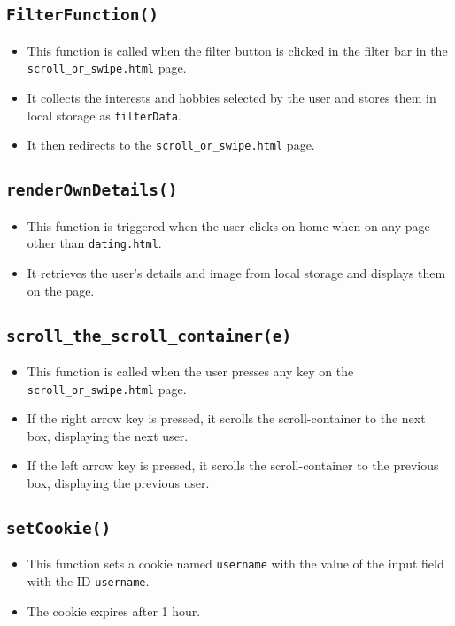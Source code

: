 \documentclass[12pt,a4paper]{article}
\begin{document}
\subsection{\texttt{FilterFunction()}}
\begin{itemize}
    \item This function is called when the filter button is clicked in the filter bar in the \texttt{scroll\_or\_swipe.html} page.
    \item It collects the interests and hobbies selected by the user and stores them in local storage as \texttt{filterData}.
    \item It then redirects to the \texttt{scroll\_or\_swipe.html} page.
\end{itemize}

\subsection{\texttt{renderOwnDetails()}}
\begin{itemize}
    \item This function is triggered when the user clicks on home when on any page other than \texttt{dating.html}.
    \item It retrieves the user's details and image from local storage and displays them on the page.
\end{itemize}

\subsection{\texttt{scroll\_the\_scroll\_container(e)}}
\begin{itemize}
    \item This function is called when the user presses any key on the \texttt{scroll\_or\_swipe.html} page.
    \item If the right arrow key is pressed, it scrolls the scroll-container to the next box, displaying the next user.
    \item If the left arrow key is pressed, it scrolls the scroll-container to the previous box, displaying the previous user.
\end{itemize}

\subsection{\texttt{setCookie()}}
\begin{itemize}
    \item This function sets a cookie named \texttt{username} with the value of the input field with the ID \texttt{username}.
    \item The cookie expires after 1 hour.
\end{itemize}
\end{document}

